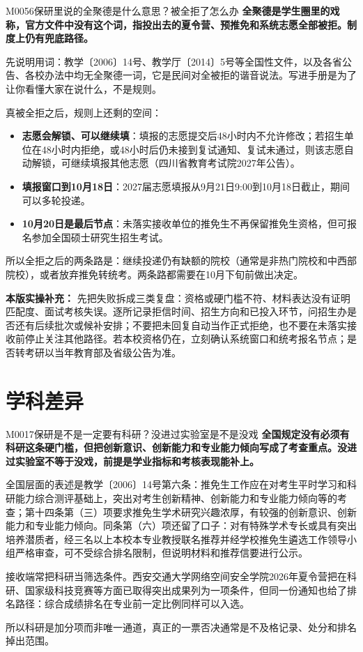 \begin{qa}{M0056}{保研里说的全聚德是什么意思？被全拒了怎么办}
\textbf{全聚德是学生圈里的戏称，官方文件中没有这个词，指投出去的夏令营、预推免和系统志愿全部被拒。制度上仍有兜底路径。}

先说明用词：教学〔2006〕14号、教学厅〔2014〕5号等全国性文件，以及各省公告、各校办法中均无全聚德一词，它是民间对全被拒的谐音说法。写进手册是为了让你看懂大家在说什么，不是规则。

真被全拒之后，规则上还剩的空间：

\begin{itemize}
  \item \textbf{志愿会解锁、可以继续填}：填报的志愿提交后48小时内不允许修改；若招生单位在48小时内拒绝，或48小时后仍未接到复试通知、复试未通过，则该志愿自动解锁，可继续填报其他志愿（四川省教育考试院2027年公告）。
  \item \textbf{填报窗口到10月18日}：2027届志愿填报从9月21日9:00到10月18日截止，期间可以多轮投递。
  \item \textbf{10月20日是最后节点}：未落实接收单位的推免生不再保留推免生资格，但可报名参加全国硕士研究生招生考试。
\end{itemize}

所以全拒之后的两条路是：继续投递仍有缺额的院校（通常是非热门院校和中西部院校），或者放弃推免转统考。两条路都需要在10月下旬前做出决定。
\par\textbf{本版实操补充：} 先把失败拆成三类复盘：资格或硬门槛不符、材料表达没有证明匹配度、面试考核失误。逐所记录拒信时间、招生方向和已投入环节，问招生办是否还有后续批次或候补安排；不要把未回复自动当作正式拒绝，也不要在未落实接收前停止关注其他路径。若本校资格仍在，立刻确认系统窗口和统考报名节点；是否转考研以当年教育部及省级公告为准。
\end{qa}

\section{学科差异}
\begin{qa}{M0017}{保研是不是一定要有科研？没进过实验室是不是没戏}
\textbf{全国规定没有必须有科研这条硬门槛，但把创新意识、创新能力和专业能力倾向写成了考查重点。没进过实验室不等于没戏，前提是学业指标和考核表现能补上。}

全国层面的表述是教学〔2006〕14号第六条：推免生工作应在对考生平时学习和科研能力综合测评基础上，突出对考生创新精神、创新能力和专业能力倾向等的考查；第十四条第（三）项要求推免生学术研究兴趣浓厚，有较强的创新意识、创新能力和专业能力倾向。同条第（六）项还留了口子：对有特殊学术专长或具有突出培养潜质者，经三名以上本校本专业教授联名推荐并经学校推免生遴选工作领导小组严格审查，可不受综合排名限制，但说明材料和推荐信要进行公示。

接收端常把科研当筛选条件。西安交通大学网络空间安全学院2026年夏令营把在科研、国家级科技竞赛等方面已取得突出成果列为一项条件，但同一份通知也给了排名路径：综合成绩排名在专业前一定比例同样可以入选。

所以科研是加分项而非唯一通道，真正的一票否决通常是不及格记录、处分和排名掉出范围。
\end{qa}

